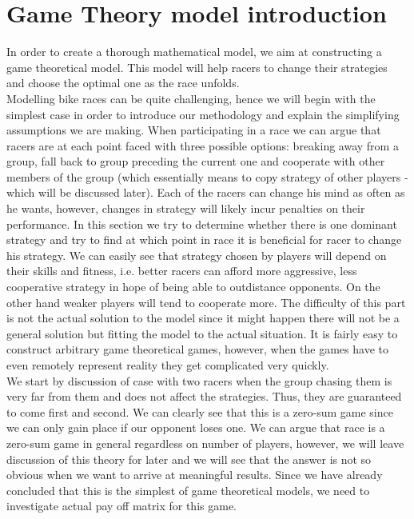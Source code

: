 \documentclass[10pt, a4paper]{report}
\begin{document}

\section{Game Theory model introduction}

In order to create a thorough mathematical model, we aim at constructing a game theoretical model. This model will help racers to change their strategies and choose the optimal one as the race unfolds.\\

Modelling bike races can be quite challenging, hence we will begin with the simplest case in order to introduce our methodology and explain the simplifying assumptions we are making. When participating in a race we can argue that racers are at each point faced with three possible options: breaking away from a group, fall back to group preceding the current one and cooperate with other members of the group (which essentially means to copy strategy of other players - which will be discussed later). Each of the racers can change his mind as often as he wants, however, changes in strategy will likely incur penalties on their performance. In this section we try to determine whether there is one dominant strategy and try to find at which point in race it is beneficial for racer to change his strategy. We can easily see that strategy chosen by players will depend on their skills and fitness, i.e. better racers can afford more aggressive, less cooperative strategy in hope of being able to outdistance opponents. On the other hand weaker players will tend to cooperate more. The difficulty of this part is not the actual solution to the model since it might happen there will not be a general solution but fitting the model to the actual situation. It is fairly easy to construct arbitrary game theoretical games, however, when the games have to even remotely represent reality they get complicated very quickly.\\

We start by discussion of case with two racers when the group chasing them is very far from them and does not affect the strategies. Thus, they are guaranteed to come first and second. We can clearly see that this is a zero-sum game since we can only gain place if our opponent loses one. We can argue that race is a zero-sum game in general regardless on number of players, however, we will leave discussion of this theory for later and we will see that the answer is not so obvious when we want to arrive at meaningful results. Since we have already concluded that this is the simplest of game theoretical models, we need to investigate actual pay off matrix for this game.
\end{document}
